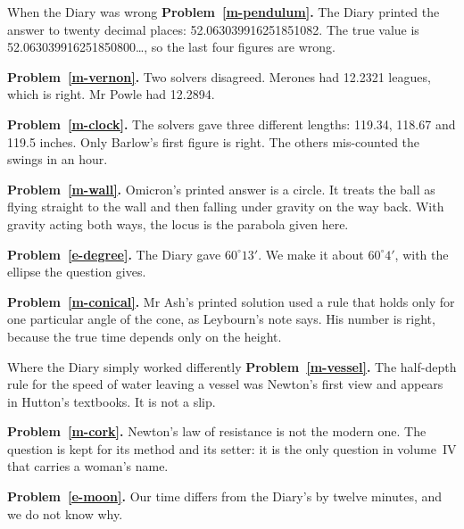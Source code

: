 \documentclass[11pt,a4paper]{article}
\begin{document}
\begin{diarynote}{When the Diary was wrong}
\textbf{Problem~\ref{m-pendulum}.} The Diary printed the answer to twenty decimal places:
52.063039916251851082. The true value is 52.063039916251850800\dots, so the last four
figures are wrong.

\textbf{Problem~\ref{m-vernon}.} Two solvers disagreed. Merones had 12.2321 leagues, which
is right. Mr Powle had 12.2894.

\textbf{Problem~\ref{m-clock}.} The solvers gave three different lengths: 119.34, 118.67 and
119.5 inches. Only Barlow's first figure is right. The others mis-counted the swings in an
hour.

\textbf{Problem~\ref{m-wall}.} Omicron's printed answer is a circle. It treats the ball as
flying straight to the wall and then falling under gravity on the way back. With gravity
acting both ways, the locus is the parabola given here.

\textbf{Problem~\ref{e-degree}.} The Diary gave $60^\circ13'$. We make it about $60^\circ4'$,
with the ellipse the question gives.

\textbf{Problem~\ref{m-conical}.} Mr Ash's printed solution used a rule that holds only for
one particular angle of the cone, as Leybourn's note says. His number is right, because
the true time depends only on the height.
\end{diarynote}

\begin{diarynote}{Where the Diary simply worked differently}
\textbf{Problem~\ref{m-vessel}.} The half-depth rule for the speed of water leaving a vessel
was Newton's first view and appears in Hutton's textbooks. It is not a slip.

\textbf{Problem~\ref{m-cork}.} Newton's law of resistance is not the modern one. The
question is kept for its method and its setter: it is the only question in volume~IV
that carries a woman's name.

\textbf{Problem~\ref{e-moon}.} Our time differs from the Diary's by twelve minutes, and we
do not know why.
\end{diarynote}
\end{document}
